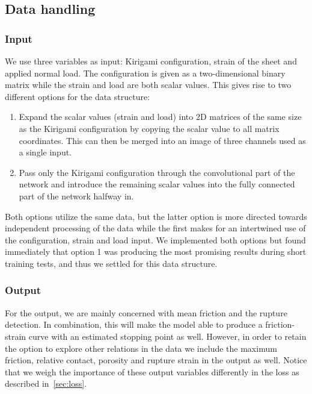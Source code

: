 \subsection{Data handling}
\subsubsection{Input}
We use three variables as input: Kirigami configuration, strain of the sheet
and applied normal load. The configuration is given as a two-dimensional binary matrix while the strain and load are both scalar values. This gives rise to two different options for the data structure:
\begin{enumerate}
  \item Expand the scalar values (strain and load) into 2D matrices of the same
  size as the Kirigami configuration by copying the scalar value to all matrix coordinates. This can then be merged into an image of three channels used as a single input.  
  \item Pass only the Kirigami configuration through the convolutional part of the network and introduce the remaining scalar values into the fully connected part of the network halfway in. 
\end{enumerate}
Both options utilize the same data, but the latter option is more directed towards independent processing of the data while the first makes for an intertwined use of the configuration, strain and load input. We implemented both options but found immediately that option 1 was producing the most promising results during short training tests, and thus we settled for this data structure. 

\subsubsection{Output}
For the output, we are mainly concerned with mean friction and the rupture
detection. In combination, this will make the model able to produce a friction-strain curve with an estimated stopping point as well. However, in order to retain the option to explore other relations in the data we include the maximum friction, relative contact, porosity and rupture strain in the output as well. Notice that we weigh the importance of these output variables differently in the loss as described in~\cref{sec:loss}. 


